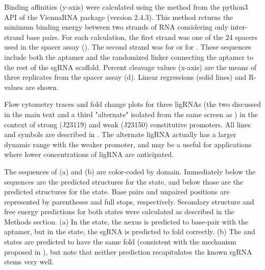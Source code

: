 \documentclass[10pt,oneside]{article}
\begin{document}
     Binding affinities (y-axis) were calculated using the  method from the python3 API of the ViennaRNA package (version 2.4.3).  This method returns the minimum binding energy between two strands of RNA considering only inter-strand base pairs.  For each calculation, the first strand was one of the 24  spacers used in the \invitro{} spacer assay ().  The second strand was  for \ligrnaF{} or  for \ligrnaB{}.  These sequences include both the aptamer and the randomized linker connecting the aptamer to the rest of the sgRNA scaffold.  Percent cleavage values (x-axis) are the means of three replicates from the \invitro{} spacer assay (d).  Linear regressions (solid lines) and R-values are shown.



      Flow cytometry traces and fold change plots for three ligRNAs (the two discussed in the main text and a third "alternate" isolated from the same screen as \ligrnaF{}) in the context of strong (J23119) and weak (J23150) constitutive promoters.  All lines and symbols are described in .  The alternate ligRNA actually has a larger dynamic range with the weaker promoter, and may be a useful for applications where lower concentrations of ligRNA are anticipated.



     The sequences of \ligrnaF{} (a) and \ligrnaB{} (b) are color-coded by domain.  Immediately below the sequences are the predicted structures for the \apo{} state, and below those are the predicted structures for the \holo{} state.  Base pairs and unpaired positions are represented by parentheses and full stops, respectively.  Secondary structure and free energy predictions for both states were calculated as described in the Methods section.  (a) In the \apo{} state, the nexus is predicted to base-pair with the aptamer, but in the \holo{} state, the sgRNA is predicted to fold correctly.  (b) The \apo{} and \holo{} states are predicted to have the same fold (consistent with the mechanism proposed in ), but note that neither prediction recapitulates the known sgRNA stems very well.
\end{document}
